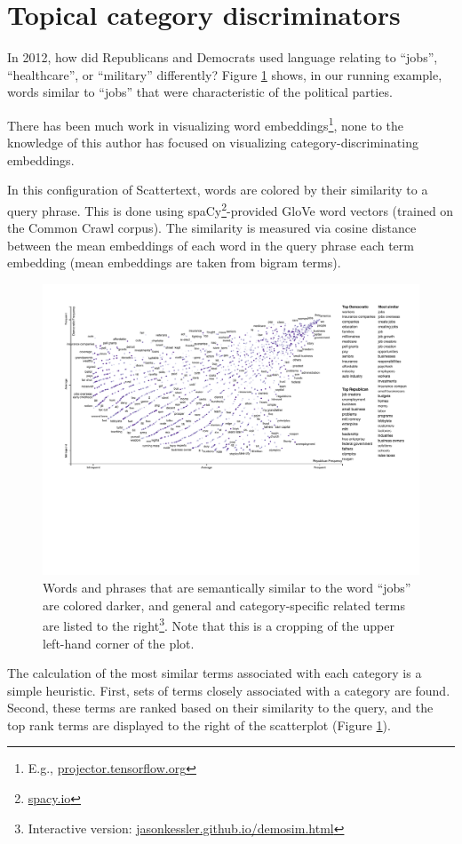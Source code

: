 \documentclass[11pt,a4paper]{article}
\begin{document}
\vspace{-.25cm}
\section{Topical category discriminators}
\label{embeddings}

In 2012, how did Republicans and Democrats used language relating to ``jobs'', ``healthcare'', or ``military'' differently?   Figure \ref{scattertextembeddings} shows, in our running example, words similar to ``jobs'' that were characteristic of the political parties.  

There has been much work in visualizing word embeddings\footnote{E.g., \href{http://projector.tensorflow.org/}{projector.tensorflow.org}}, none to the knowledge of this author has focused on visualizing category-discriminating embeddings.

In this configuration of Scattertext, words are colored by their similarity to a query phrase.  This is done using spaCy\footnote{\href{https://spacy.io/}{spacy.io}}-provided GloVe \cite{glove} word vectors (trained on the Common Crawl corpus).  The similarity is measured via cosine distance between the mean embeddings of each word in the query phrase each term embedding (mean embeddings are taken from bigram terms).  
\begin{figure}[h]
\vspace{-.3cm}
  \includegraphics[width=\linewidth]{similarity_scattertext_portion}
  \caption{Words and phrases that are semantically similar to the word ``jobs'' are colored darker, and general and category-specific related terms are listed to the right\footnote{Interactive version: \href{https://jasonkessler.github.io/demosim.html}{jasonkessler.github.io/demosim.html}}.  Note that this is a cropping of the upper left-hand corner of the plot.}
  \label{scattertextembeddings}
\vspace{-.2cm}
\end{figure}
The calculation of the most similar terms associated with each category is a simple heuristic.  First, sets of terms closely associated with a category are found. Second, these terms are ranked based on their similarity to the query, and the top rank terms are displayed to the right of the scatterplot (Figure \ref{scattertextembeddings}).  
\end{document}
